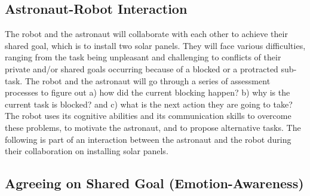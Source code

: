 \subsection{Astronaut-Robot Interaction}

The robot and the astronaut will collaborate with each other to achieve their
shared goal, which is to install two solar panels. They will face various
difficulties, ranging from the task being unpleasant and challenging to
conflicts of their private and/or shared goals occurring because of a blocked or
a protracted sub-task. The robot and the astronaut will go through a series of
assessment processes to figure out a) how did the current blocking happen? b)
why is the current task is blocked? and c) what is the next action they are
going to take? The robot uses its cognitive abilities and its communication
skills to overcome these problems, to motivate the astronaut, and to propose
alternative tasks. The following is part of an interaction between the astronaut
and the robot during their collaboration on installing solar panels.

\subsection{Agreeing on Shared Goal (Emotion-Awareness)}
\label{sec:exp1}

